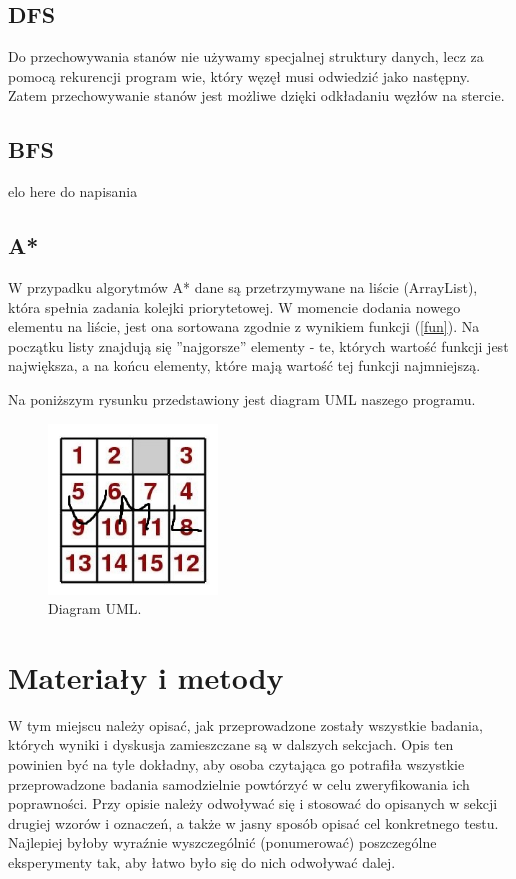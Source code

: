 \documentclass{classrep}
\begin{document}
\subsection{DFS}
Do przechowywania stanów nie używamy specjalnej struktury danych, lecz za pomocą rekurencji program wie, który węzęł musi odwiedzić jako następny. Zatem przechowywanie stanów jest możliwe dzięki odkładaniu węzłów na stercie.
\subsection{BFS}
{\color{red} elo here do napisania}

\subsection{A*}
W przypadku algorytmów A* dane są przetrzymywane na liście (ArrayList), która spełnia zadania kolejki priorytetowej. W momencie dodania nowego elementu na liście, jest ona sortowana zgodnie z wynikiem funkcji (\ref{fun}). Na początku listy znajdują się ''najgorsze'' elementy - te, których wartość funkcji jest największa, a na końcu elementy, które mają wartość tej funkcji najmniejszą.

Na poniższym rysunku przedstawiony jest diagram UML naszego programu.
\begin{figure}[h!]
    \centering
    \includegraphics[width=0.4\textwidth]{uml.jpg}
    \caption{Diagram UML.}
\end{figure}
\newpage

\section{Materiały i metody}
{\color{blue}
W tym miejscu należy opisać, jak przeprowadzone zostały wszystkie badania,
których wyniki i dyskusja zamieszczane są w dalszych sekcjach. Opis ten
powinien być na tyle dokładny, aby osoba czytająca go potrafiła wszystkie
przeprowadzone badania samodzielnie powtórzyć w celu zweryfikowania ich
poprawności. Przy opisie należy odwoływać się i stosować do
opisanych w sekcji drugiej wzorów i oznaczeń, a także w jasny sposób opisać
cel konkretnego testu. Najlepiej byłoby wyraźnie wyszczególnić (ponumerować)
poszczególne eksperymenty tak, aby łatwo było się do nich odwoływać dalej.}
\end{document}
